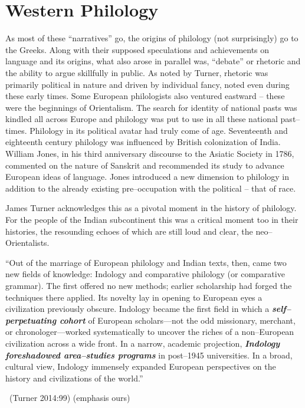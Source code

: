 \section*{Western Philology}

As most of these “narratives” go, the origins of philology (not surprisingly) go to the Greeks. Along with their supposed speculations and achievements on language and its origins, what also arose in parallel was, “debate” or rhetoric and the ability to argue skillfully in public. As noted by Turner, rhetoric was primarily political in nature and driven by individual fancy, noted even during these early times. Some European philologists also ventured eastward – these were the beginnings of Orientalism. The search for identity of national pasts was kindled all across Europe and philology was put to use in all these national past–times. Philology in its political avatar had truly come of age. Seventeenth and eighteenth century philology was influenced by British colonization of India. William Jones, in his third anniversary discourse to the Asiatic Society in 1786, commented on the nature of Sanskrit and recommended its study to advance European ideas of language. Jones introduced a new dimension to philology in addition to the already existing pre–occupation with the political – that of race.

James Turner acknowledges this as a pivotal moment in the history of philology. For the people of the Indian subcontinent this was a critical moment too in their histories, the resounding echoes of which are still loud and clear, the neo–Orientalists.

\begin{myquote}
“Out of the marriage of European philology and Indian texts, then, came two new fields of knowledge: Indology and comparative philology (or comparative grammar). The first offered no new methods; earlier scholarship had forged the techniques there applied. Its novelty lay in opening to European eyes a civilization previously obscure. Indology became the first field in which a \textbf{\textit{self–perpetuating cohort}} of European scholars—not the odd missionary, merchant, or chronologer—worked systematically to uncover the riches of a non–European civilization across a wide front. In a narrow, academic projection, \textbf{\textit{Indology foreshadowed area–studies programs}} in post–1945 universities. In a broad, cultural view, Indology immensely expanded European perspectives on the history and civilizations of the world.”

~\hfill (Turner 2014:99) (emphasis ours)
\end{myquote}

